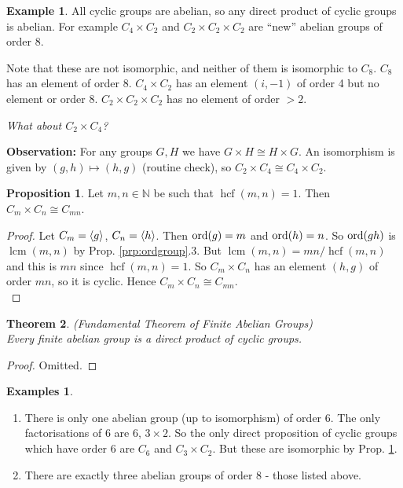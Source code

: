\documentclass{article}
\newtheorem{theorem}{Theorem}
\theoremstyle{definition} \newtheorem*{definition}{Definition}
\newtheorem{proposition}[theorem]{Proposition}
\newtheorem*{exmp}{Example} \newtheorem*{exmps}{Examples}
\newcommand{\naturals}{\mathbb{N}} \newcommand{\complexes}{\mathbb{C}}
\newcommand{\ism}{\cong} \newcommand{\elemt}[2]{#1_{{#2}\sigma(#2)}}
\DeclareMathOperator{\lcm}{lcm} \DeclareMathOperator{\hcf}{hcf}
\begin{document}
\begin{exmp} All cyclic groups are abelian, so any direct product of cyclic
  groups is abelian. For example $C_4 \times C_2$ and $C_2 \times C_2 \times
  C_2$ are ``new'' abelian groups of order 8.

  Note that these are not isomorphic, and neither of them is isomorphic to
  $C_8$. $C_8$ has an element of order 8. $C_4 \times C_2$ has an element
  $(i,-1)$ of order 4 but no element or order 8.  $C_2 \times C_2 \times C_2$
  has no element of order $> 2$.

\end{exmp} \emph{What about $C_2 \times C_4$?}

  \textbf{Observation:} For any groups $G,H$ we have $G \times H \ism H \times
  G$. An isomorphism is given by $(g,h)\mapsto (h,g)$ (routine check), so $C_2
  \times C_4 \ism C_4 \times C_2$.\\

  \begin{proposition} \label{prp:hcfcyclic} Let $m,n \in \naturals$ be such
    that $\hcf(m,n)=1$. Then $C_m \times C_n \ism C_{mn}$.  \end{proposition}

  \begin{proof} Let $C_m = \langle g \rangle$, $C_n=\langle h \rangle$. Then $\operatorname{\text{ord}}(g)=m$ and
    $\operatorname{\text{ord}}(h)=n$. So $\operatorname{\text{ord}}(gh)$ is $\lcm(m,n)$ by Prop. \ref{prp:ordgroup}.3.
    But $\lcm(m,n)=mn/\hcf(m,n)$ and this is $mn$ since $\hcf(m,n)=1$. So $C_m
    \times C_n$ has an element $(h,g)$ of order $mn$, so it is cyclic. Hence
    $C_m \times C_n \ism C_{mn}$.\\ \end{proof} 

  \begin{theorem}(Fundamental Theorem of Finite Abelian Groups)\hfill\\ Every
    finite abelian group is a direct product of cyclic groups.
    \label{thm:funda} \end{theorem}

  \begin{proof} Omitted.  \end{proof}

  \begin{exmps}\hfill \begin{enumerate} \item There is only one abelian group
            (up to isomorphism) of order 6. The only factorisations of 6 are 6,
            $3 \times 2$. So the only direct proposition of cyclic groups which
            have order 6 are $C_6$ and $C_3 \times C_2$. But these are
            isomorphic by Prop. \ref{prp:hcfcyclic}.  \item There are exactly
              three abelian groups of order 8 - those listed above.
          \end{enumerate} \end{exmps}
\end{document}
